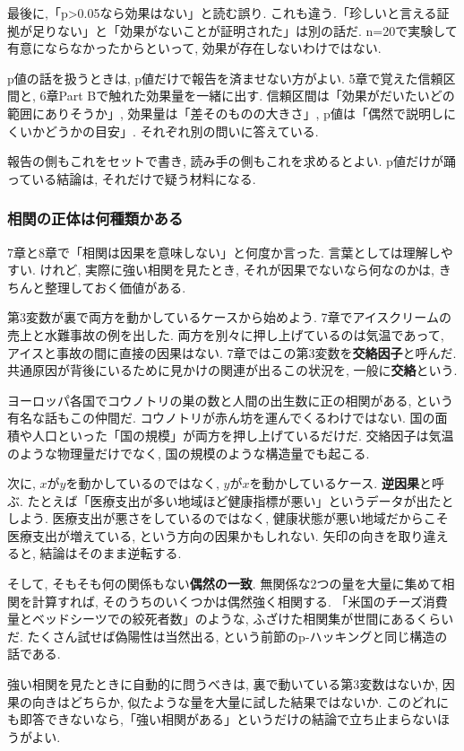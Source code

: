 最後に,「p>0.05なら効果はない」と読む誤り.
これも違う.「珍しいと言える証拠が足りない」と「効果がないことが証明された」は別の話だ.
n=20で実験して有意にならなかったからといって, 効果が存在しないわけではない.

p値の話を扱うときは, p値だけで報告を済ませない方がよい.
5章で覚えた信頼区間と, 6章Part Bで触れた効果量を一緒に出す.
信頼区間は「効果がだいたいどの範囲にありそうか」, 効果量は「差そのものの大きさ」, p値は「偶然で説明しにくいかどうかの目安」.
それぞれ別の問いに答えている.

報告の側もこれをセットで書き, 読み手の側もこれを求めるとよい.
p値だけが踊っている結論は, それだけで疑う材料になる.

\subsubsection*{相関の正体は何種類かある}

7章と8章で「相関は因果を意味しない」と何度か言った.
言葉としては理解しやすい. けれど, 実際に強い相関を見たとき, それが因果でないなら何なのかは, きちんと整理しておく価値がある.

第3変数が裏で両方を動かしているケースから始めよう. 7章でアイスクリームの売上と水難事故の例を出した. 両方を別々に押し上げているのは気温であって, アイスと事故の間に直接の因果はない. 7章ではこの第3変数を\textbf{交絡因子}と呼んだ. 共通原因が背後にいるために見かけの関連が出るこの状況を, 一般に\textbf{交絡}という.

ヨーロッパ各国でコウノトリの巣の数と人間の出生数に正の相関がある, という有名な話もこの仲間だ.
コウノトリが赤ん坊を運んでくるわけではない. 国の面積や人口といった「国の規模」が両方を押し上げているだけだ.
交絡因子は気温のような物理量だけでなく, 国の規模のような構造量でも起こる.

次に, $x$が$y$を動かしているのではなく, $y$が$x$を動かしているケース. \textbf{逆因果}と呼ぶ.
たとえば「医療支出が多い地域ほど健康指標が悪い」というデータが出たとしよう.
医療支出が悪さをしているのではなく, 健康状態が悪い地域だからこそ医療支出が増えている, という方向の因果かもしれない.
矢印の向きを取り違えると, 結論はそのまま逆転する.

そして, そもそも何の関係もない\textbf{偶然の一致}.
無関係な2つの量を大量に集めて相関を計算すれば, そのうちのいくつかは偶然強く相関する.
「米国のチーズ消費量とベッドシーツでの絞死者数」のような, ふざけた相関集が世間にあるくらいだ.
たくさん試せば偽陽性は当然出る, という前節のp-ハッキングと同じ構造の話である.

強い相関を見たときに自動的に問うべきは, 裏で動いている第3変数はないか, 因果の向きはどちらか, 似たような量を大量に試した結果ではないか.
このどれにも即答できないなら,「強い相関がある」というだけの結論で立ち止まらないほうがよい.

